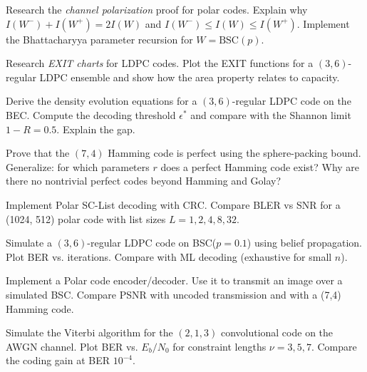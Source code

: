 \begin{exercise}[Challenge]
Research the \emph{channel polarization} proof for polar codes. Explain why $I(W^-)+I(W^+) = 2I(W)$ and $I(W^-) \le I(W) \le I(W^+)$. Implement the Bhattacharyya parameter recursion for $W = \text{BSC}(p)$.
\end{exercise}

\begin{exercise}[Challenge]
Research \emph{EXIT charts} for LDPC codes. Plot the EXIT functions for a $(3,6)$-regular LDPC ensemble and show how the area property relates to capacity.
\end{exercise}

\begin{exercise}[Challenge]
Derive the density evolution equations for a $(3,6)$-regular LDPC code on the BEC. Compute the decoding threshold $\epsilon^*$ and compare with the Shannon limit $1 - R = 0.5$. Explain the gap.
\end{exercise}

\begin{exercise}[Challenge]
Prove that the $(7,4)$ Hamming code is perfect using the sphere-packing bound. Generalize: for which parameters $r$ does a perfect Hamming code exist? Why are there no nontrivial perfect codes beyond Hamming and Golay?
\end{exercise}

\begin{exercise}[Challenge]
Implement Polar SC-List decoding with CRC. Compare BLER vs SNR for a (1024, 512) polar code with list sizes $L=1, 2, 4, 8, 32$.
\end{exercise}

\begin{exercise}[Computational]
Simulate a $(3,6)$-regular LDPC code on BSC($p=0.1$) using belief propagation. Plot BER vs. iterations. Compare with ML decoding (exhaustive for small $n$).
\end{exercise}

\begin{exercise}[Computational]
Implement a Polar code encoder/decoder. Use it to transmit an image over a simulated BSC. Compare PSNR with uncoded transmission and with a (7,4) Hamming code.
\end{exercise}

\begin{exercise}[Computational]
Simulate the Viterbi algorithm for the $(2,1,3)$ convolutional code on the AWGN channel. Plot BER vs. $E_b/N_0$ for constraint lengths $\nu = 3, 5, 7$. Compare the coding gain at BER $10^{-4}$.
\end{exercise}

